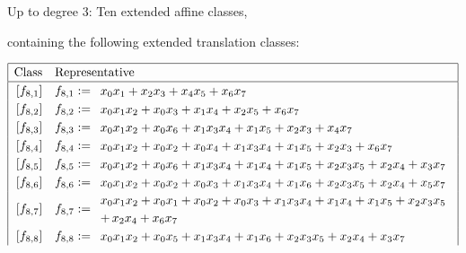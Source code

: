 \documentclass[pdf,sprung,slideColor,nocolorBG]{beamer}
\newenvironment{colortheme}[1]{
\def\ProvidesPackageRCS $##1${\relax}
\renewcommand{\ProcessOptions}{\relax}
\makeatletter

\makeatother
}{}
\begin{document}
\begin{colortheme}{jubata}
\begin{frame}
Up to degree 3:
Ten extended affine classes, 

containing the following extended translation classes:

\tiny{}
\begin{align*}
\def\arraystretch{1.2}
\begin{array}{|cl|}
\hline
\text{Class} &
\text{Representative}
\\
\hline
\,[f_{ 8 , 1 }] & f_{ 8 , 1 } :=
\begin{array}{l}
x_{0} x_{1} + x_{2} x_{3} + x_{4} x_{5} + x_{6} x_{7}
\end{array}
\\
\,[f_{ 8 , 2 }] & f_{ 8 , 2 } :=
\begin{array}{l}
x_{0} x_{1} x_{2} + x_{0} x_{3} + x_{1} x_{4} + x_{2} x_{5} + x_{6} x_{7}
\end{array}
\\
\,[f_{ 8 , 3 }] & f_{ 8 , 3 } :=
\begin{array}{l}
x_{0} x_{1} x_{2} + x_{0} x_{6} + x_{1} x_{3} x_{4} + x_{1} x_{5} + x_{2} x_{3} + x_{4} x_{7}
\end{array}
\\
\,[f_{ 8 , 4 }] & f_{ 8 , 4 } :=
\begin{array}{l}
x_{0} x_{1} x_{2} + x_{0} x_{2} + x_{0} x_{4} + x_{1} x_{3} x_{4} + x_{1} x_{5} + x_{2} x_{3} + x_{6} x_{7}
\end{array}
\\
\,[f_{ 8 , 5 }] & f_{ 8 , 5 } :=
\begin{array}{l}
x_{0} x_{1} x_{2} + x_{0} x_{6} + x_{1} x_{3} x_{4} + x_{1} x_{4} + x_{1} x_{5} + x_{2} x_{3} x_{5} + x_{2} x_{4} + x_{3} x_{7}
\end{array}
\\
\,[f_{ 8 , 6 }] & f_{ 8 , 6 } :=
\begin{array}{l}
x_{0} x_{1} x_{2} + x_{0} x_{2} + x_{0} x_{3} + x_{1} x_{3} x_{4} + x_{1} x_{6} + x_{2} x_{3} x_{5} + x_{2} x_{4} + x_{5} x_{7}
\end{array}
\\
\,[f_{ 8 , 7 }] & f_{ 8 , 7 } :=
\begin{array}{l}
x_{0} x_{1} x_{2} + x_{0} x_{1} + x_{0} x_{2} + x_{0} x_{3} + x_{1} x_{3} x_{4} + x_{1} x_{4} + x_{1} x_{5} + x_{2} x_{3} x_{5} 
\\
+\,  x_{2} x_{4} + x_{6} x_{7}
\end{array}
\\
\,[f_{ 8 , 8 }] & f_{ 8 , 8 } :=
\begin{array}{l}
x_{0} x_{1} x_{2} + x_{0} x_{5} + x_{1} x_{3} x_{4} + x_{1} x_{6} + x_{2} x_{3} x_{5} + x_{2} x_{4} + x_{3} x_{7}

\end{array}
\end{array}
\end{align*}
\end{frame}
\end{colortheme}
\end{document}
